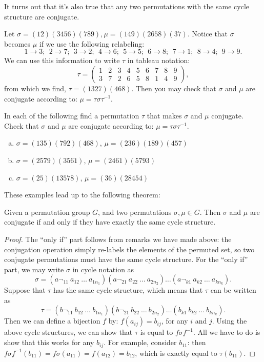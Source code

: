 It turns out that it's also true that any two permutations with the same cycle structure are conjugate.

\begin{example}\label{example:actions:Coj4}
Let $\sigma = (12)(3456)(789), \mu = (149)(2658)(37)$.  Notice that $\sigma$ becomes $\mu$ if we use the following relabeling:
$$ 1 \rightarrow 3;~~2 \rightarrow 7;~~3\rightarrow 2;~~4\rightarrow 6;~~5\rightarrow 5;~~6\rightarrow 8;~~7\rightarrow 1;~~8\rightarrow 4;~~9\rightarrow 9.$$
We can use this information to write $\tau$ in tableau notation:
$$ \tau =\begin{pmatrix} 1&2&3&4&5&6&7&8&9 \\ 3&7&2&6&5&8&1&4&9 \end{pmatrix}, $$
from which we find, $\tau=(1327)(468)$.  Then you may check that $\sigma$ and $\mu$ are conjugate according to: $\mu = \tau \sigma \tau^{-1}$.
\end{example}
\begin{exercise}\label{exercise:actions:Conj5}
In each of the following find a permutation $\tau$ that makes $\sigma$ and $\mu$ conjugate.  Check that $\sigma$ and $\mu$ are conjugate according to: $\mu = \tau \sigma \tau^{-1}$.

\begin {enumerate}[(a)]
\item $\sigma=(135)(792)(468)$, $\mu=(236)(189)(457)$
\item $\sigma=(2579)(3561)$, $\mu=(2461)(5793)$
\item $\sigma=(25)(13578)$, $\mu=(36)(28454)$
\end{enumerate}
\end{exercise}
These examples lead up to the following theorem:

\begin{prop}\label{proposition:actions:ConjPerm} Given a permutation group $G$, and two permutations $\sigma, \mu \in G$.  Then $\sigma$ and $\mu$ are conjugate if and only if they have exactly the same cycle structure.
\end{prop}
\begin{proof}
The ``only if'' part follows from remarks we have made above: the conjugation operation simply re-labels the elements of the permuted set, so two conjugate permutations must have the same cycle structure.
For the ``only if'' part, we may write $\sigma$ in cycle notation as
$$\sigma = (a¬_{11}~a_{12}~\ldots~a_{1n_1})(a¬_{21}~a_{22}~\ldots~a_{2n_2})  \ldots(a¬_{k1}~a_{k2}~\ldots~a_{k n_k}).$$  
Suppose that $\tau$ has the same cycle structure, which means that $\tau$ can be written as
$$\tau = (b¬_{11}~b_{12}~\ldots~b_{1n_1})(b¬_{21}~b_{22}~\ldots~b_{2n_2})  \ldots(b_{k1}~b_{k2}~\ldots~b_{k n_k}).$$
Then we can define a bijection $f$ by: $f(a_{ij}) = b_{ij}$, for any $i$ and $j$. Using the above cycle structures, we can show that $\tau$ is equal to $f \sigma f^{-1}$.  All we have to do is show that this works for any $ b_{ij}$.  For example, consider $b_{11}$: then $f \sigma f^{-1}( b_{11}) = f \sigma ( a_{11}) = f ( a_{12})= b_{12}$, which is exactly equal to $ \tau(b_{11})$.
\end{proof}

